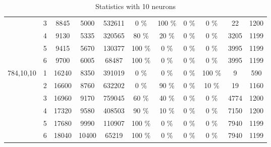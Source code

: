 \begin{table} [!ht]
\begin{tabular}{ ||c||c|c|c|c|c|c|c|c|c|c| }
& 3 & 8845 & 5000 & 532611 & 0 \% & 100 \% & 0 \% & 0 \% & 22 & 1200 \\ 
& 4 & 9130 & 5335 & 320565 & 80 \% & 20 \% & 0 \% & 0 \% & 3205 & 1199 \\ 
& 5 & 9415 & 5670 & 130377 & 100 \% & 0 \% & 0 \% & 0 \% & 3995 & 1199 \\ 
& 6 & 9700 & 6005 & 68487 & 100 \% & 0 \% & 0 \% & 0 \% & 3995 & 1199 \\ 
\hline \hline
\multirow{6}{4em}{784,10,10}
& 1 & 16240 & 8350 & 391019 & 0 \% & 0 \% & 0 \% & 100 \% & 9 & 590 \\ 
& 2 & 16600 & 8760 & 632202 & 0 \% & 90 \% & 0 \% & 10 \% & 19 & 1160 \\ 
& 3 & 16960 & 9170 & 759045 & 60 \% & 40 \% & 0 \% & 0 \% & 4774 & 1200 \\ 
& 4 & 17320 & 9580 & 408503 & 90 \% & 10 \% & 0 \% & 0 \% & 7150 & 1200 \\ 
& 5 & 17680 & 9990 & 110907 & 100 \% & 0 \% & 0 \% & 0 \% & 7940 & 1199 \\ 
& 6 & 18040 & 10400 & 65219 & 100 \% & 0 \% & 0 \% & 0 \% & 7940 & 1199 \\ 
\hline \hline
\end{tabular} \caption{Statistics with 10 neurons}\label{tab:10N-E1} \end{table}
